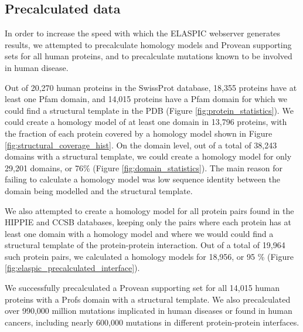 \clearpage
\subsection{Precalculated data} \label{sec:precalculated_data}

In order to increase the speed with which the ELASPIC webserver generates results, we attempted to precalculate homology models and Provean supporting sets for all human proteins, and to precalculate mutations known to be involved in human disease.

Out of 20,270 human proteins in the SwissProt database, 18,355 proteins have at least one Pfam domain, and 14,015 proteins have a Pfam domain for which we could find a structural template in the PDB (Figure \ref{fig:protein_statistics}). We could create a homology model of at least one domain in 13,796 proteins, with the fraction of each protein covered by a homology model shown in Figure \ref{fig:structural_coverage_hist}. On the domain level, out of a total of 38,243 domains with a structural template, we could create a homology model for only 29,201 domains, or 76\% (Figure \ref{fig:domain_statistics}). The main reason for failing to calculate a homology model was low sequence identity between the domain being modelled and the structural template.

We also attempted to create a homology model for all protein pairs found in the HIPPIE \cite{schaefer_hippie:_2012} and CCSB \cite{rolland_proteome-scale_2014} databases, keeping only the pairs where each protein has at least one domain with a homology model and where we would could find a structural template of the protein-protein interaction. Out of a total of 19,964 such protein pairs, we calculated a homology models for 18,956, or 95 \% (Figure \ref{fig:elaspic_precalculated_interface}).

We successfully precalculated a Provean supporting set for all 14,015 human proteins with a Profs domain with a structural template. We also precalculated over 990,000 million mutations implicated in human diseases or found in human cancers, including nearly 600,000 mutations in different protein-protein interfaces.


